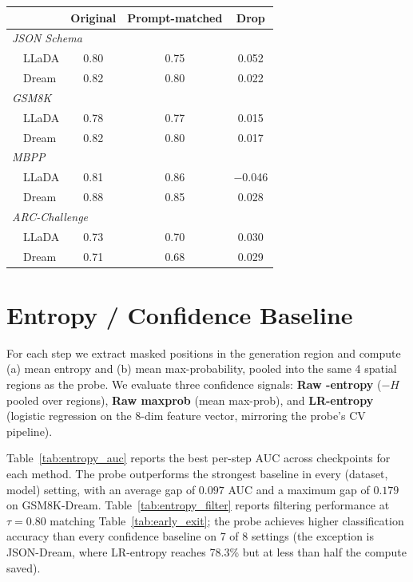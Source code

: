 \documentclass[11pt]{article}
\providecommand{\linenumbers}{}
\providecommand{\nolinenumbers}{}
\begin{document}
\nolinenumbers
\begin{center}
  \small
  \label{tab:prompt_length}
  \begin{tabular}{lccc}
    \toprule
    & \textbf{Original} & \textbf{Prompt-matched} & \textbf{Drop} \\
    \midrule
    \multicolumn{4}{l}{\textit{JSON Schema}} \\
    ~~LLaDA & 0.80 & 0.75 & 0.052 \\
    ~~Dream & 0.82 & 0.80 & 0.022 \\
    \midrule
    \multicolumn{4}{l}{\textit{GSM8K}} \\
    ~~LLaDA & 0.78 & 0.77 & 0.015 \\
    ~~Dream & 0.82 & 0.80 & 0.017 \\
    \midrule
    \multicolumn{4}{l}{\textit{MBPP}} \\
    ~~LLaDA & 0.81 & 0.86 & $-$0.046 \\
    ~~Dream & 0.88 & 0.85 & 0.028 \\
    \midrule
    \multicolumn{4}{l}{\textit{ARC-Challenge}} \\
    ~~LLaDA & 0.73 & 0.70 & 0.030 \\
    ~~Dream & 0.71 & 0.68 & 0.029 \\
    \bottomrule
  \end{tabular}
\end{center}
\linenumbers

\section{Entropy / Confidence Baseline}
\label{sec:appendix_entropy}

For each step we extract masked positions in the generation region and compute (a) mean entropy and (b) mean max-probability, pooled into the same 4 spatial regions as the probe. We evaluate three confidence signals:
\textbf{Raw -entropy} ($-H$ pooled over regions),
\textbf{Raw maxprob} (mean max-prob),
and \textbf{LR-entropy} (logistic regression on the 8-dim feature vector, mirroring the probe's CV pipeline).

Table~\ref{tab:entropy_auc} reports the best per-step AUC across checkpoints for each method. The probe outperforms the strongest baseline in every (dataset, model) setting, with an average gap of $0.097$ AUC and a maximum gap of $0.179$ on \mbox{GSM8K-Dream}.
Table~\ref{tab:entropy_filter} reports filtering performance at $\tau = 0.80$ matching Table~\ref{tab:early_exit}; the probe achieves higher classification accuracy than every confidence baseline on 7 of 8 settings (the exception is \mbox{JSON-Dream}, where LR-entropy reaches 78.3\% but at less than half the compute saved).
\end{document}
